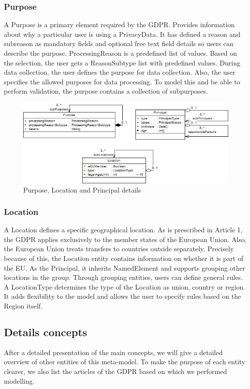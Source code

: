 \documentclass[11pt,english]{article}
\begin{document}
\subsubsection{Purpose}
A Purpose is a primary element required by the GDPR. Provides information about why a particular user is using a PrivacyData. It has defined a reason and subreason as mandatory fields and optional free text field details so users can describe the purpose. ProcessingReason is a predefined list of values. Based on the selection, the user gets a ReasonSubtype list with predefined values. During data collection, the user defines the purpose for data collection. Also, the user specifies the allowed purposes for data processing. To model this and be able to perform validation, the purpose contains a collection of subpurposes. 
\begin{figure}
    \centering
    \includegraphics[width=12.5cm]{images/purposeAndPrincipal.jpg}
    \caption{Purpose, Location and Principal details}
    \label{fig:purpose}
\end{figure}
\subsubsection{Location}
A Location defines a specific geographical location. As is prescribed in Article 1, the GDPR applies exclusively to the member states of the European Union. Also, the European Union treats transfers to countries outside separately. Precisely because of this, the Location entity contains information on whether it is part of the EU. As the Principal, it inherits NamedElement and supports grouping other locations in the group. Through grouping entities, users can define general rules. A LocationType determines the type of the Location as union, country or region. It adds flexibility to the model and allows the user to specify rules based on the  Region itself.
\subsection{Details concepts}
After a detailed presentation of the main concepts, we will give a detailed overview of other entities of this meta-model. To make the purpose of each entity clearer, we also list the articles of the GDPR based on which we performed modelling.
\end{document}
